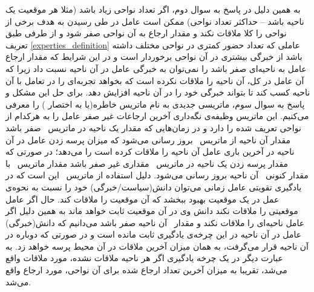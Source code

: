 به همین دلیل در پاسخ به سوال دوم، اگر تعداد نواحی زیاد باشد (مثلا هر موقعیت یک ناحیه باشد -- حداکثر تعداد نواحی) ممکن است عامل در طی رسیدن به هدف برخی از نواحی را کلا ملاقات نکند و مقدار ارجاع به آن نواحی صفر شود و از طرفی طبق تعریف \ref{experties_definition} عاملی که تعداد حضور کمتری در نواحی مختلف داشته باشد از خبرگی بیشتری در آن نواحی برخوردار است و در این شرایط که مقدار ارجاع عامل به ناحیه‌ای صفر باشد را نمی‌توان به خبرگی عامل در آن ناحیه نسبت داد زیرا که آن عامل در کل، آن ناحیه را ملاقات نکرده است که بخواهد تجربه‌ای را در تعامل با آن ناحیه کسب کند تا بتواند خبرگی خود را در آن ناحیه افزایش دهد. برای حل این مشکل و پاسخ به سوال سوم، ماتریسی جدیدی به نام ماتریس خاطره(یا به اختصار ) را معرفی می‌کنیم. این ماتریس وظیفه‌ی نگه‌داری آخرین ارجاعات غیر صفر عامل را به هرکدام از نواحی تعریف شده را دارد و در زمان‌هایی که مقدار یک ناحیه در ماتریس \ صفر باشد مقدار آن ناحیه از ماتریس \ بروز رسانی می‌شود که میزان پرسه زدن عامل در آن ناحیه در آخرین باری عامل آن ناحیه را ملاقات کرده است را می‌دهد؛ در صورتی که مقدار پرسه زدن یک ناحیه در ماتریس \ مقداری غیر صفر باشد مقدار ماتریس \ با مقدار کنونی \ آن ناحیه بروز رسانی می‌شود.
دلیل استفاده از ماتریس \ این است که در یادگیری تقویتی عامل زمانی می‌توان دانش(سیاست/خبرگی) خود را نسبت به نحوه‌ی عمل در یک موقعیت بهبود ببخشد که آن موقعیت را ملاقات کند. حال اگر عامل موقعیتی را ملاقات نکند دانش وی در آن موقعیت ثابت خواهد ماند به همین دلیل اگر عامل ناحیه‌ای را ملاقات نکند و مقدار \ آن ناحیه صفر باشد می‌دانیم که دانش(خبرگی) عامل در آن ناحیه در این چرخه‌ی یادگیری ثابت مانده است و در صورتی که دوباره در آن ناحیه قرار می‌گرفت،  به همان میزان آخرین ملاقات در آن محیط پرسه خواهد زد. به عبارت دیگر در یک چرخه یادگیری اگر هر ناحیه ملاقات نشده، مورد ملاقات واقع می‌شد، تقریبا به میزان آخرین تعداد ارجاع شده برای آن نواحی، مورد ارجاع واقع می‌شد.